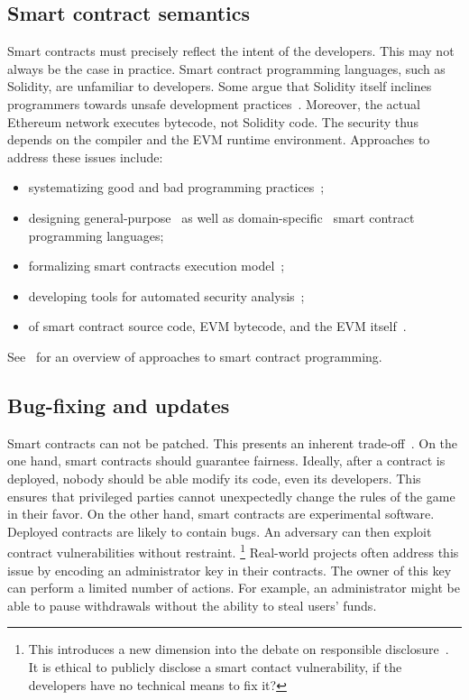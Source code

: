 \subsection{Smart contract semantics}
Smart contracts must precisely reflect the intent of the developers.
This may not always be the case in practice.
Smart contract programming languages, such as Solidity, are unfamiliar to developers.
Some argue that Solidity itself inclines programmers towards unsafe development practices~\cite{ydtm2016}.
Moreover, the actual Ethereum network executes bytecode, not Solidity code.
The security thus depends on the compiler and the EVM runtime environment.
Approaches to address these issues include:
\begin{itemize}
	\item systematizing good and bad programming practices~\cite{ConsenSys16, Chen2017};
	\item designing general-purpose~\cite{Hirai2017a, Buterin2017b, Pettersson2016} as well as domain-specific~\cite{Biryukov2017, EgelundMueller2017} smart contract programming languages;
	\item formalizing smart contracts execution model~\cite{Sergey2017};
	\item developing tools for automated security analysis~\cite{Luu2016a, Tsankov2018};
	\item of smart contract source code, EVM bytecode, and the EVM itself~\cite{Bhargavan2016, Hirai2017}.
\end{itemize}

See~\cite{Seijas2016} for an overview of approaches to smart contract programming.

\subsection{Bug-fixing and updates}
Smart contracts can not be patched.
This presents an inherent trade-off~\cite{Porru2017}.
On the one hand, smart contracts should guarantee fairness.
Ideally, after a contract is deployed, nobody should be able modify its code, even its developers.
This ensures that privileged parties cannot unexpectedly change the rules of the game in their favor.
On the other hand, smart contracts are experimental software.
Deployed contracts are likely to contain bugs.
An adversary can then exploit contract vulnerabilities without restraint.
\footnote{This introduces a new dimension into the debate on responsible disclosure~\cite{Schneier2007}. It is ethical to publicly disclose a smart contact vulnerability, if the developers have no technical means to fix it?}
Real-world projects often address this issue by encoding an administrator key in their contracts.
The owner of this key can perform a limited number of actions.
For example, an administrator might be able to pause withdrawals without the ability to steal users' funds.

